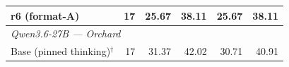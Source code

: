 \begin{table}[t]
{\begin{tabular}{lrrrrr}
r6 (format-A) & 17 & 25.67 & 38.11 & 25.67 & 38.11 \\
\midrule
\multicolumn{6}{l}{\textit{Qwen3.6-27B --- Orchard}} \\
Base (pinned thinking)$^{\dagger}$ & 17 & 31.37 & 42.02 & 30.71 & 40.91 \\
\bottomrule
\end{tabular}%
}
\end{table}
